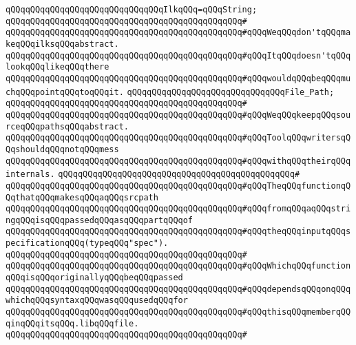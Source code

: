 \newline
\verb|qQQqqQQqqQQqqQQqqQQqqQQqqQQqqQQqIlkqQQq=qQQqString;|\newline
\verb|qQQqqQQqqQQqqQQqqQQqqQQqqQQqqQQqqQQqqQQqqQQqqQQq#|\newline
\verb|qQQqqQQqqQQqqQQqqQQqqQQqqQQqqQQqqQQqqQQqqQQqqQQq#qQQqWeqQQqdon'tqQQqmakeqQQqilksqQQqabstract.|\newline
\verb|qQQqqQQqqQQqqQQqqQQqqQQqqQQqqQQqqQQqqQQqqQQqqQQq#qQQqItqQQqdoesn'tqQQqlookqQQqlikeqQQqthere|\newline
\verb|qQQqqQQqqQQqqQQqqQQqqQQqqQQqqQQqqQQqqQQqqQQqqQQq#qQQqwouldqQQqbeqQQqmuchqQQqpointqQQqtoqQQqit.|\newline
\newline
\verb|qQQqqQQqqQQqqQQqqQQqqQQqqQQqqQQqFile_Path;|\newline
\verb|qQQqqQQqqQQqqQQqqQQqqQQqqQQqqQQqqQQqqQQqqQQqqQQq#|\newline
\verb|qQQqqQQqqQQqqQQqqQQqqQQqqQQqqQQqqQQqqQQqqQQqqQQq#qQQqWeqQQqkeepqQQqsourceqQQqpathsqQQqabstract.|\newline
\verb|qQQqqQQqqQQqqQQqqQQqqQQqqQQqqQQqqQQqqQQqqQQqqQQq#qQQqToolqQQqwritersqQQqshouldqQQqnotqQQqmess|\newline
\verb|qQQqqQQqqQQqqQQqqQQqqQQqqQQqqQQqqQQqqQQqqQQqqQQq#qQQqwithqQQqtheirqQQqinternals.|\newline
\verb|qQQqqQQqqQQqqQQqqQQqqQQqqQQqqQQqqQQqqQQqqQQqqQQq#|\newline
\verb|qQQqqQQqqQQqqQQqqQQqqQQqqQQqqQQqqQQqqQQqqQQqqQQq#qQQqTheqQQqfunctionqQQqthatqQQqmakesqQQqaqQQqsrcpath|\newline
\verb|qQQqqQQqqQQqqQQqqQQqqQQqqQQqqQQqqQQqqQQqqQQqqQQq#qQQqfromqQQqaqQQqstringqQQqisqQQqpassedqQQqasqQQqpartqQQqof|\newline
\verb|qQQqqQQqqQQqqQQqqQQqqQQqqQQqqQQqqQQqqQQqqQQqqQQq#qQQqtheqQQqinputqQQqspecificationqQQq(typeqQQq"spec").|\newline
\verb|qQQqqQQqqQQqqQQqqQQqqQQqqQQqqQQqqQQqqQQqqQQqqQQq#|\newline
\verb|qQQqqQQqqQQqqQQqqQQqqQQqqQQqqQQqqQQqqQQqqQQqqQQq#qQQqWhichqQQqfunctionqQQqisqQQqoriginallyqQQqbeqQQqpassed|\newline
\verb|qQQqqQQqqQQqqQQqqQQqqQQqqQQqqQQqqQQqqQQqqQQqqQQq#qQQqdependsqQQqonqQQqwhichqQQqsyntaxqQQqwasqQQqusedqQQqfor|\newline
\verb|qQQqqQQqqQQqqQQqqQQqqQQqqQQqqQQqqQQqqQQqqQQqqQQq#qQQqthisqQQqmemberqQQqinqQQqitsqQQq.libqQQqfile.|\newline
\verb|qQQqqQQqqQQqqQQqqQQqqQQqqQQqqQQqqQQqqQQqqQQqqQQq#|\newline
